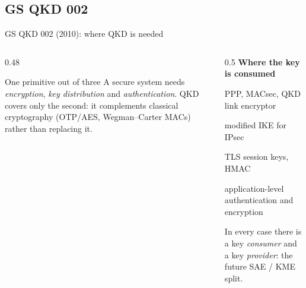 \documentclass[10pt]{beamer}
\begin{document}
\subsection{GS QKD 002}

\begin{frame}{GS QKD 002 (2010): where QKD is needed}
  \begin{columns}[T]
    \begin{column}{0.48\textwidth}
      \begin{block}{One primitive out of three}
        A secure system needs \emph{encryption}, \emph{key distribution}
        and \emph{authentication}. QKD covers \alert{only the second}: it
        complements classical cryptography (OTP/AES, Wegman–Carter MACs)
        rather than replacing it.
      \end{block}
    \end{column}
    \begin{column}{0.5\textwidth}
      \textbf{Where the key is consumed}
      \begin{description}\small
        \item[L2] PPP, MACsec, QKD link encryptor
        \item[L3] modified IKE for IPsec
        \item[L4] TLS session keys, HMAC
        \item[L7] application-level authentication and encryption
      \end{description}
      \small In every case there is a key \emph{consumer} and a key
      \emph{provider}: the future \alert{SAE / KME} split.
    \end{column}
  \end{columns}
\end{frame}
\end{document}
